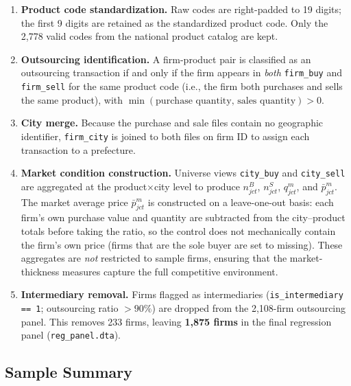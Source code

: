 \documentclass[12pt]{article}
\begin{document}
\begin{enumerate}[leftmargin=1.8em, label=\arabic*.]

  \item \textbf{Product code standardization.}
    Raw codes are right-padded to 19 digits; the first 9 digits are retained as
    the standardized product code. Only the 2,778 valid codes from the national
    product catalog are kept.

  \item \textbf{Outsourcing identification.}
    A firm-product pair is classified as an outsourcing transaction if and only
    if the firm appears in \emph{both} \texttt{firm\_buy} and
    \texttt{firm\_sell} for the same product code (i.e., the firm both purchases
    and sells the same product), with
    \(\min(\text{purchase quantity},\, \text{sales quantity}) > 0\).

  \item \textbf{City merge.}
    Because the purchase and sale files contain no geographic identifier,
    \texttt{firm\_city} is joined to both files on firm ID to assign each
    transaction to a prefecture.

  \item \textbf{Market condition construction.}
    Universe views \texttt{city\_buy} and \texttt{city\_sell} are aggregated at
    the product\(\times\)city level to produce \(n^{B}_{jct}\),
    \(n^{S}_{jct}\), \(q^{m}_{jct}\), and \(\bar{p}^{m}_{jct}\).
    The market average price \(\bar{p}^{m}_{jct}\) is constructed on a
    leave-one-out basis: each firm's own purchase value and quantity are
    subtracted from the city--product totals before taking the ratio, so the
    control does not mechanically contain the firm's own price (firms that are
    the sole buyer are set to missing).
    These aggregates are \emph{not} restricted to sample firms, ensuring that
    the market-thickness measures capture the full competitive environment.

  \item \textbf{Intermediary removal.}
    Firms flagged as intermediaries (\texttt{is\_intermediary == 1};
    outsourcing ratio \(>90\%\)) are dropped from the 2,108-firm outsourcing
    panel. This removes 233 firms, leaving \textbf{1,875 firms} in the final
    regression panel (\texttt{reg\_panel.dta}).

\end{enumerate}

\subsection*{Sample Summary}
\end{document}

